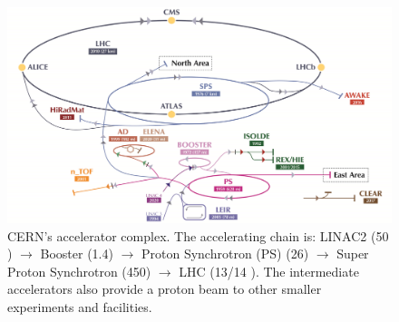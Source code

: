 \begin{figure}[h!]
    \centering
    \includegraphics[width=\textwidth]{fig//chap03-cms/cern.jpg}
    \caption{CERN's accelerator complex. The accelerating chain is: LINAC2 (50 \MeV) $\to$ Booster (1.4\GeV) $\to$ Proton Synchrotron (PS) (26\GeV) $\to$ Super Proton Synchrotron (450\GeV) $\to$ LHC (13/14 \TeV). The intermediate accelerators also provide a proton beam to other smaller experiments and facilities. \cite{Panoramas}}
    \label{fig:cern}
\end{figure}

